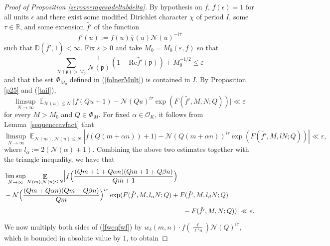 \documentclass[11pt]{amsart}
\theoremstyle{definition}
\DeclareMathOperator*{\E}{\mathbb{E}}
\newcommand{\D}{{\mathbb D}}
\newcommand{\NN}{{\mathcal N}}
\newcommand{\R}{{\mathbb R}}
\newcommand{\mf}{\mathfrak}
\newcommand{\e}{\epsilon}
\begin{document}
\begin{proof}[Proof of Proposition \ref{zeroaveragesadeltabdelta}]
By hypothesis on $f$,  $f(\e)=1$ for all units $\e$ and there exist some modified Dirichlet character $\chi$ of period $I$, some $\tau\in\R$, and some extension $\tilde{f'}$ of the function
$$f'(u):=f(u)\overline{\chi}(u)\NN(u)^{-i\tau}$$
such that 
  $\D(\tilde{f'}, 1)<\infty$.
Fix $\varepsilon>0$ and take $M_{0}=M_{0}(\varepsilon,f)$ so that 
\begin{equation}\label{tail}
    \sum_{\NN(\mf p)>M_{0}}\frac{1}{\NN( \mf p)}(1-\text{Re}\tilde{f'}(\mf p))+M_{0}^{-1/2}\leq \varepsilon
\end{equation}
and that the set $\Phi_{M_{0}}$ defined in (\ref{folnerMult}) is contained in $I$.  
By Proposition \ref{p25} and (\ref{tail}), %
$$\limsup_{N\to\infty}\E_{\NN(u)\leq N}\vert f(Qu+1)-\NN(Qu)^{i\tau}\exp(F(\tilde{f'},M,N;Q))\vert\ll\varepsilon$$
for every $M>M_{0}$ and $Q\in\Phi_{M}$.
For fixed  $\alpha \in \mathcal{O}_K$, it follows from Lemma~\ref{sequenceavfact}  that
\[
\limsup_{N\to\infty}\E_{\NN(m), \NN(n) \leq N}\left| f(Q(m+ \alpha n))+1)-\NN(Q(m+\alpha n))^{i\tau}\exp(F(\tilde{f'},M,lN;Q))\right|\ll\varepsilon,
\]
where $l_{\alpha}:=2(\NN(\alpha)+1)$.
Combining the above two estimates together with the triangle inequality, %
we have that
 \begin{equation}\label{fweqfwf} 
    \begin{split}
&\limsup_{N\to\infty}\E_{\NN(m),\NN(n)\leq N}\Bigl\vert f\Bigl(\frac{(Qm+1+Q\alpha n)(Qm+1+Q\beta n)}{Qm+1}\Bigr) 
       \\&-\NN\Bigl(\frac{(Qm+Q\alpha n)(Qm+Q\beta n)}{Qm}\Bigr)^{i\tau}\exp(F(\tilde{f'},M,l_{\alpha}N;Q)+F(\tilde{f'},M,l_{\beta}N;Q)\\&\quad\quad\quad\quad\quad\quad\quad\quad\quad\quad\quad\quad\quad\quad\quad\quad\quad\quad\quad\quad\quad\quad\quad\quad\quad\quad\quad-F(\tilde{f'},M,N;Q))\Bigr\vert\ll\varepsilon. 
    \end{split}
\end{equation}
We now multiply both sides of (\ref{fweqfwf}) by $w_{\delta}(m,n)\cdot f(\frac{\ell}{\ell'n})\NN(Q)^{i\tau}$, which is bounded in absolute value by $1$, to obtain

\end{proof}
\end{document}
